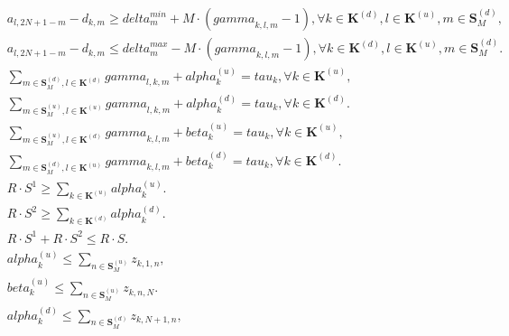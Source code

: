 \begin{align}
  & a_{l , 2 N + 1 - m} - d_{k , m} \geq \mathit{delta}_{m}^{m i n} + M \cdot \left(\mathit{gamma}_{k , l , m} - 1\right) , \forall k \in \mathbf{K}^{\left(d\right)} , l \in \mathbf{K}^{\left(u\right)} , m \in \mathbf{S}_{M}^{\left(d\right)} , \tag{eq\_0027} \\
  & a_{l , 2 N + 1 - m} - d_{k , m} \leq \mathit{delta}_{m}^{m a x} - M \cdot \left(\mathit{gamma}_{k , l , m} - 1\right) , \forall k \in \mathbf{K}^{\left(d\right)} , l \in \mathbf{K}^{\left(u\right)} , m \in \mathbf{S}_{M}^{\left(d\right)} . \tag{eq\_0028} \\
  & \sum_{m \in \mathbf{S}_{M}^{\left(d\right)}, l \in \mathbf{K}^{\left(d\right)}} \mathit{gamma}_{l , k , m} + \mathit{alpha}_{k}^{\left(u\right)} = \mathit{tau}_{k} , \forall k \in \mathbf{K}^{\left(u\right)} , \tag{eq\_0029} \\
  & \sum_{m \in \mathbf{S}_{M}^{\left(u\right)}, l \in \mathbf{K}^{\left(u\right)}} \mathit{gamma}_{l , k , m} + \mathit{alpha}_{k}^{\left(d\right)} = \mathit{tau}_{k} , \forall k \in \mathbf{K}^{\left(d\right)} . \tag{eq\_0030} \\
  & \sum_{m \in \mathbf{S}_{M}^{\left(u\right)}, l \in \mathbf{K}^{\left(d\right)}} \mathit{gamma}_{k , l , m} + \mathit{beta}_{k}^{\left(u\right)} = \mathit{tau}_{k} , \forall k \in \mathbf{K}^{\left(u\right)} , \tag{eq\_0031} \\
  & \sum_{m \in \mathbf{S}_{M}^{\left(d\right)}, l \in \mathbf{K}^{\left(u\right)}} \mathit{gamma}_{k , l , m} + \mathit{beta}_{k}^{\left(d\right)} = \mathit{tau}_{k} , \forall k \in \mathbf{K}^{\left(d\right)} . \tag{eq\_0032} \\
  & R \cdot S^{1} \geq \sum_{k \in \mathbf{K}^{\left(u\right)}} \mathit{alpha}_{k}^{\left(u\right)} . \tag{eq\_0033} \\
  & R \cdot S^{2} \geq \sum_{k \in \mathbf{K}^{\left(d\right)}} \mathit{alpha}_{k}^{\left(d\right)} . \tag{eq\_0034} \\
  & R \cdot S^{1} + R \cdot S^{2} \leq R \cdot S . \tag{eq\_0035} \\
  & \mathit{alpha}_{k}^{\left(u\right)} \leq \sum_{n \in \mathbf{S}_{M}^{\left(u\right)}} z_{k , 1 , n} , \tag{eq\_0036} \\
  & \mathit{beta}_{k}^{\left(u\right)} \leq \sum_{n \in \mathbf{S}_{M}^{\left(u\right)}} z_{k , n , N} . \tag{eq\_0037} \\
  & \mathit{alpha}_{k}^{\left(d\right)} \leq \sum_{n \in \mathbf{S}_{M}^{\left(d\right)}} z_{k , N + 1 , n} , \tag{eq\_0038} \\

\end{align}
